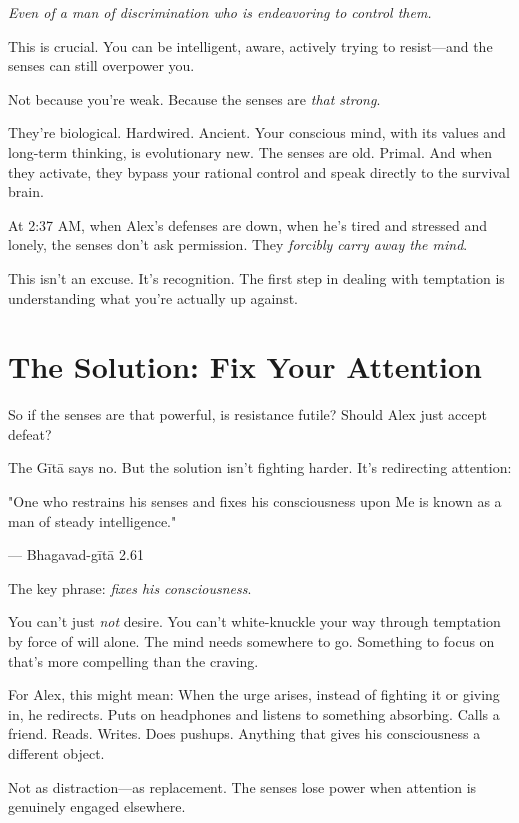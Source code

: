 \documentclass[11pt,twoside]{book}
\begin{document}
\textit{Even of a man of discrimination who is endeavoring to control them.}

This is crucial. You can be intelligent, aware, actively trying to resist—and the senses can still overpower you.

Not because you're weak. Because the senses are \textit{that strong}.

They're biological. Hardwired. Ancient. Your conscious mind, with its values and long-term thinking, is evolutionary new. The senses are old. Primal. And when they activate, they bypass your rational control and speak directly to the survival brain.

At 2:37 AM, when Alex's defenses are down, when he's tired and stressed and lonely, the senses don't ask permission. They \textit{forcibly carry away the mind}.

This isn't an excuse. It's recognition. The first step in dealing with temptation is understanding what you're actually up against.

\section*{The Solution: Fix Your Attention}

So if the senses are that powerful, is resistance futile? Should Alex just accept defeat?

The Gītā says no. But the solution isn't fighting harder. It's redirecting attention:

\begin{pullquote}
"One who restrains his senses and fixes his consciousness upon Me is known as a man of steady intelligence."

--- Bhagavad-gītā 2.61
\end{pullquote}

The key phrase: \textit{fixes his consciousness}.

You can't just \textit{not} desire. You can't white-knuckle your way through temptation by force of will alone. The mind needs somewhere to go. Something to focus on that's more compelling than the craving.

For Alex, this might mean: When the urge arises, instead of fighting it or giving in, he redirects. Puts on headphones and listens to something absorbing. Calls a friend. Reads. Writes. Does pushups. Anything that gives his consciousness a different object.

Not as distraction—as replacement. The senses lose power when attention is genuinely engaged elsewhere.
\end{document}
